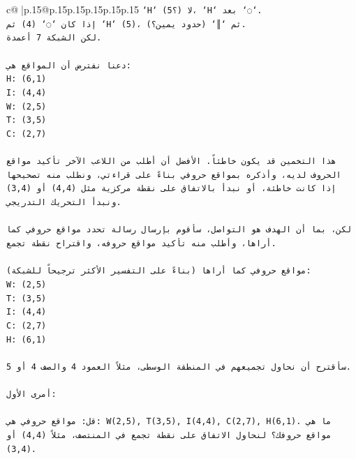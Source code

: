 \documentclass{article}
\begin{document}
{\begin{supertabular}{c@{$\;$}|p{.15\linewidth}@{}p{.15\linewidth}p{.15\linewidth}p{.15\linewidth}p{.15\linewidth}p{.15\linewidth}}
{{{\texttt{`H` (5؟) لا، `H` بعد `◌`.} \\
\texttt{إذا كان `◌` (4) ثم `H` (5)، ثم `║` (حدود يمين؟).} \\
\texttt{لكن الشبكة 7 أعمدة.} \\
\\ 
\texttt{دعنا نفترض أن المواقع هي:} \\
\texttt{H: (6,1)} \\
\texttt{I: (4,4)} \\
\texttt{W: (2,5)} \\
\texttt{T: (3,5)} \\
\texttt{C: (2,7)} \\
\\ 
\texttt{هذا التخمين قد يكون خاطئاً. الأفضل أن أطلب من اللاعب الآخر تأكيد مواقع الحروف لديه، وأذكره بمواقع حروفي بناءً على قراءتي، ونطلب منه تصحيحها إذا كانت خاطئة، أو نبدأ بالاتفاق على نقطة مركزية مثل (4,4) أو (3,4) ونبدأ التحريك التدريجي.} \\
\\ 
\texttt{لكن، بما أن الهدف هو التواصل، سأقوم بإرسال رسالة تحدد مواقع حروفي كما أراها، وأطلب منه تأكيد مواقع حروفه، واقتراح نقطة تجمع.} \\
\\ 
\texttt{مواقع حروفي كما أراها (بناءً على التفسير الأكثر ترجيحاً للشبكة):} \\
\texttt{W: (2,5)} \\
\texttt{T: (3,5)} \\
\texttt{I: (4,4)} \\
\texttt{C: (2,7)} \\
\texttt{H: (6,1)} \\
\\ 
\texttt{سأقترح أن نحاول تجميعهم في المنطقة الوسطى، مثلاً العمود 4 والصف 4 أو 5.} \\
\\ 
\texttt{أمرى الأول:} \\
\\ 
\texttt{قل: مواقع حروفي هي: W(2,5), T(3,5), I(4,4), C(2,7), H(6,1). ما هي مواقع حروفك؟ لنحاول الاتفاق على نقطة تجمع في المنتصف، مثلاً (4,4) أو (3,4).} \\
            }
        }
    }
     \\ \\


\end{supertabular}}
\end{document}

